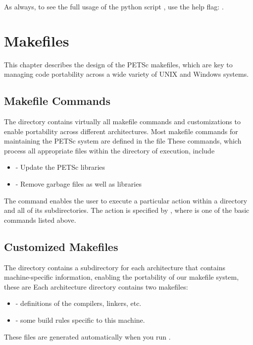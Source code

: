 As always, to see the full usage of the python script , use
the help flag:  .

\cleardoublepage
\chapter{Makefiles}
\label{ch_makefiles}

This chapter describes the design of the PETSc makefiles, which are
key to managing code portability across a wide variety of UNIX and Windows systems.



\section{Makefile Commands} \label{sec_common}

The directory
contains virtually all
makefile commands and customizations to enable portability across
different architectures.  Most makefile commands for maintaining the
PETSc system are defined in the file
These commands, which process all appropriate files within the
directory of execution, include
\begin{itemize}
\item {} - Update the PETSc libraries
\item {} - Remove garbage files as well as libraries 
\end{itemize}

The  command enables the user to execute a particular action
within a directory and all of its subdirectories.  The action is specified
by , where  is one of the basic commands
listed above. 

\section{Customized Makefiles}
\label{sec_custom}

The directory  contains a subdirectory for each
architecture that contains machine-specific information, enabling the
portability of our makefile system, these are
 Each architecture directory contains
two makefiles:
\begin{itemize}
\item {} - definitions of the compilers, linkers, etc.
\item {} - some build rules specific to this machine.
\end{itemize}
These files are generated automatically when you run .

